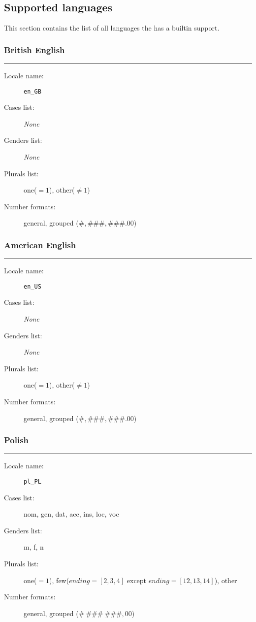 \subsection{Supported languages}\label{supLangs}

This section contains the list of all languages the \mulan{} has a builtin support. 

\def\none{\textit{None}}
\def\langName#1{\subsubsection*{#1}\hrule\vspace{1em}}

\langName{British English}
\begin{description}
	\item[Locale name:] \texttt{en\_GB}
	\item[Cases list:] \none
	\item[Genders list:] \none
	\item[Plurals list:] one($=1$), other($\not=1$)
	\item[Number formats:] general, grouped ({\small $\#,\#\#\#,\#\#\#.00$})
\end{description}

\langName{American English}
\begin{description}
	\item[Locale name:] \texttt{en\_US}
	\item[Cases list:] \none
	\item[Genders list:] \none
	\item[Plurals list:] one($=1$), other($\not=1$)
	\item[Number formats:] general, grouped ({\small $\#,\#\#\#,\#\#\#.00$})
\end{description}

\langName{Polish}
\begin{description}
	\item[Locale name:] \texttt{pl\_PL}
	\item[Cases list:] nom, gen, dat, acc, ins, loc, voc
	\item[Genders list:] m, f, n
	\item[Plurals list:] one($=1$), few($ending=[2,3,4]$ except $ending=[12,13,14]$), other
	\item[Number formats:] general, grouped ({\small $\#~\#\#\#~\#\#\#{,}00$})
\end{description}
